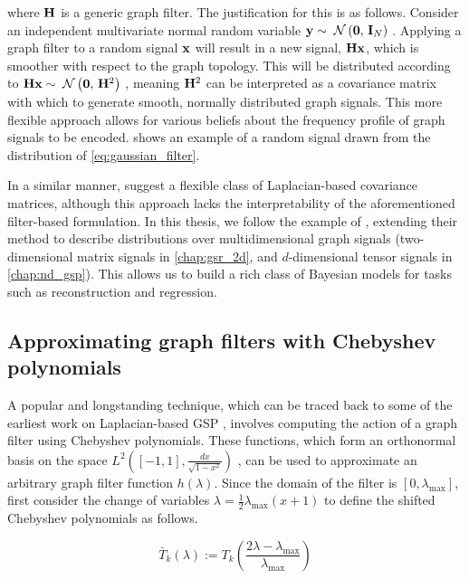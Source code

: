 where $\mathbf{H}$ is a generic graph filter. The justification for this is as follows. Consider an independent multivariate normal random variable $\mathbf{y} \sim \; \mathcal{N}\left(\mathbf{0}, \, \mathbf{I}_N\right) \;$. Applying a graph filter to a random signal $\mathbf{x}$ will result in a new signal, $\mathbf{H} \mathbf{x}$, which is smoother with respect to the graph topology. This will be distributed according to $\mathbf{H} \mathbf{x} \sim \; \mathcal{N}\left(\mathbf{0}, \, \mathbf{H}^2\right) \;$, meaning $\mathbf{H}^2$ can be interpreted as a covariance matrix with which to generate smooth, normally distributed graph signals. This more flexible approach allows for various beliefs about the frequency profile of graph signals to be encoded.  shows an example of a random signal drawn from the distribution of \cref{eq:gaussian_filter}. 

In a similar manner, \citep{Perraudin2017} suggest a flexible class of Laplacian-based covariance matrices, although this approach lacks the interpretability of the aforementioned filter-based formulation. In this thesis, we follow the example of \cite{Venkitaraman2020}, extending their method to describe distributions over multidimensional graph signals (two-dimensional matrix signals in \cref{chap:gsr_2d}, and $d$-dimensional tensor signals in \cref{chap:nd_gsp}). This allows us to build a rich class of Bayesian models for tasks such as reconstruction and regression. 

\subsection{Approximating graph filters with Chebyshev polynomials}

\label{sec:Chebyshev}

A popular and longstanding technique, which can be traced back to some of the earliest work on Laplacian-based GSP \citep{Hammond2011}, involves computing the action of a graph filter using Chebyshev polynomials. These functions, which form an orthonormal basis on the space $L^2 \left([-1, 1], \frac{dx}{\sqrt{1 - x^2}}\right)$ \citep{Mason2002}, can be used to approximate an arbitrary graph filter function $h(\lambda)$. Since the domain of the filter is $[0, \lambda_{\text{max}}]$, first consider the change of variables $\lambda = \frac{1}{2}\lambda_{\text{max}}(x + 1)$ to define the shifted Chebyshev polynomials as follows. 

\begin{equation}
    \bar{T}_k(\lambda) := T_{k}\left(\frac{2\lambda - \lambda_{\text{max}}}{\lambda_{\text{max}}}\right)
\end{equation}

